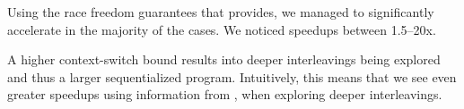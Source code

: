 Using the race freedom guarantees that \whoop provides, we managed to significantly accelerate \corral in the majority of the cases. We noticed speedups between 1.5--20x.

A higher context-switch bound results into deeper interleavings being explored and thus a larger sequentialized program. Intuitively, this means that we see even greater speedups using information from \whoop, when exploring deeper interleavings.

